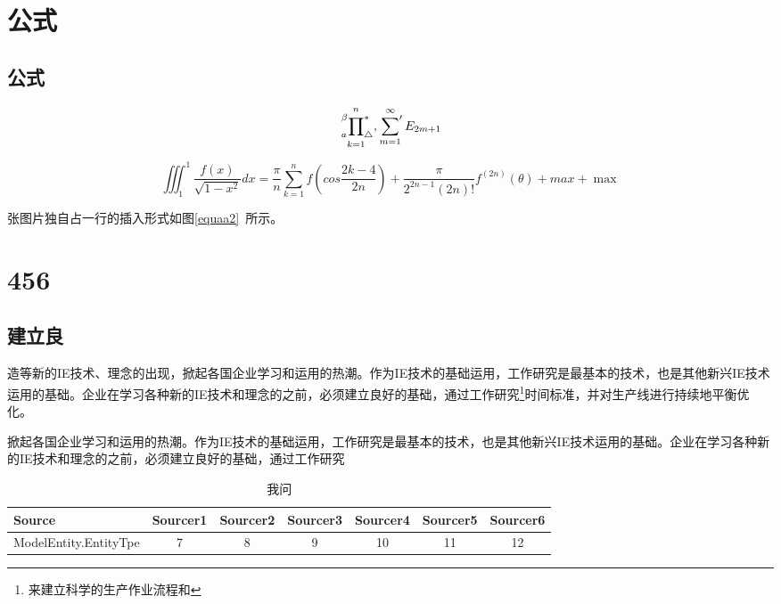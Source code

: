 \chapter{公式}
\section{公式}
\[\sideset{^\beta_a}{^\ast_\triangle}
\prod^{n}_{k=1},
\sideset{}{'}\sum_{m=1}^\infty E_{2m+1}\]

\begin{equation}
\label{equaa2}
\iiint_1^1\frac{f(x)}{\sqrt{1-x^2}}dx = \frac{\pi}{n}\sum_{k=1}^nf(cos\frac{2k-4}{2n})+\frac{\pi}{2^{2n-1}(2n)!}f^{(2n)}(\theta)+max+\max
\end{equation}



张图片独自占一行的插入形式如图\eqref{equaa2}~所示。

\chapter{456}
\section[see]{建立良}
造等新的IE技术、理念的出现，掀起各国企业学习和运用的热潮。作为IE技术的基础运用，工作研究是最基本的技术，也是其他新兴IE技术运用的基础。企业在学习各种新的IE技术和理念的之前，必须建立良好的基础，通过工作研究\footnote{来建立科学的生产作业流程和}时间标准，并对生产线进行持续地平衡优化。


掀起各国企业学习和运用的热潮。作为IE技术的基础运用，工作研究是最基本的技术，也是其他新兴IE技术运用的基础。企业在学习各种新的IE技术和\cite{2007}理念的之前，必须建立良好的基础，通过工作研究

\begin{table}[h]
  \centering
  \vspace{\baselineskip}
\caption{我问}
    \begin{tabular}{lcccccc}
    \toprule
    Source & Sourcer1 & Sourcer2 & Sourcer3 & Sourcer4 & Sourcer5 & Sourcer6 \\
    \midrule
    ModelEntity.EntityTpe & 7     & 8     & 9     & 10    & 11    & 12 \\
    \bottomrule
    \end{tabular}%
\end{table}%

